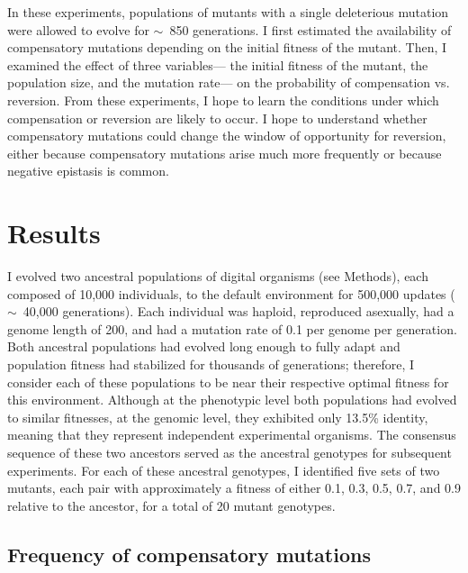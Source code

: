 \begin{doublespace}
In these experiments, populations of mutants
with a single deleterious mutation
were allowed to evolve for $\sim$~850 generations.
%
I first estimated the availability of compensatory mutations
depending on the initial fitness of the mutant.
%
Then, I examined the effect of three variables---%
the initial fitness of the mutant, the population size,
and the mutation rate---%
on the probability of compensation vs. reversion.
%
From these experiments, I hope to learn the conditions under which
compensation or reversion are likely to occur.
%
I hope to understand whether compensatory mutations
could change the window of opportunity for reversion,
either because compensatory mutations arise much more frequently
or because negative epistasis is common.



\section{Results}

I evolved two ancestral populations of digital organisms (see Methods),
each composed of 10,000 individuals,
to the default environment for 500,000 updates ($\sim$~40,000 generations).
%
Each individual was haploid, reproduced asexually,
had a genome length of 200, and had a mutation rate of 0.1
per genome per generation.
%
Both ancestral populations had evolved long enough to fully adapt
and population fitness had stabilized for thousands of generations;
therefore, I consider each of these populations
to be near their respective optimal fitness for this environment.
%
Although at the phenotypic level both populations
had evolved to similar fitnesses,
at the genomic level, they exhibited only 13.5\% identity,
meaning that they represent independent experimental organisms.
%
The consensus sequence of these two ancestors served
as the ancestral genotypes for subsequent experiments.
%
For each of these ancestral genotypes,
I identified five sets of two mutants,
each pair with approximately a fitness of either
0.1, 0.3, 0.5, 0.7, and 0.9 relative to the ancestor,
for a total of 20 mutant genotypes.



\subsection{Frequency of compensatory mutations}


\end{doublespace}
